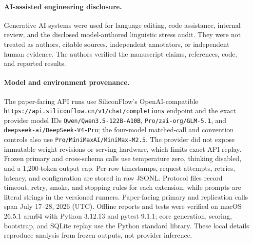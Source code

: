 \documentclass[10pt]{article}
\begin{document}
\paragraph{AI-assisted engineering disclosure.}
Generative AI systems were used for language editing, code assistance, internal review, and the
disclosed model-authored linguistic stress audit. They were not treated as authors, citable
sources, independent annotators, or independent human
evidence. The authors verified the manuscript claims, references, code, and reported results.

\paragraph{Model and environment provenance.}
The paper-facing API runs use SiliconFlow's OpenAI-compatible
\texttt{https://api.siliconflow.cn/v1/chat/completions} endpoint and the exact provider model IDs
\texttt{Qwen/Qwen3.5-122B-A10B}, \texttt{Pro/zai-org/GLM-5.1}, and
\texttt{deepseek-ai/DeepSeek-V4-Pro}; the four-model matched-call and convention controls also use
\texttt{Pro/MiniMaxAI/MiniMax-M2.5}. The provider did not expose immutable weight revisions or
serving hardware, which limits exact API replay. Frozen primary and cross-schema calls use
temperature zero, thinking disabled, and a 1,200-token output cap. Per-row timestamps, request attempts, retries,
latency, and configuration are stored in raw JSONL. Protocol files record timeout, retry, smoke,
and stopping rules for each extension, while prompts are literal strings in the versioned
runners. Paper-facing primary and replication calls span July 17--28, 2026 (UTC). Offline reports
and tests were verified on macOS 26.5.1 arm64 with Python 3.12.13 and
pytest 9.1.1; core generation, scoring, bootstrap, and SQLite replay use the Python standard
library. These local details reproduce analysis from frozen outputs, not provider inference.



\end{document}
